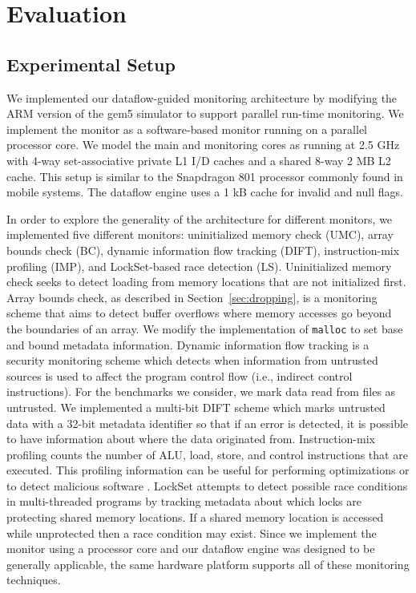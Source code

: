 \section{Evaluation}
\label{sec:evaluation}

\subsection{Experimental Setup}
\label{sec:evaluation.setup}

We implemented our dataflow-guided monitoring architecture by
modifying the ARM version of the gem5 simulator \cite{gem5} to support parallel
run-time monitoring. We implement the monitor as a software-based monitor
running on a parallel processor core. We model the main and monitoring cores as
running at 2.5
GHz with 4-way set-associative private L1 I/D caches and a shared 8-way 2 MB L2
cache. This setup is similar to the Snapdragon 801 processor commonly found in
mobile systems. The dataflow engine uses a 1 kB cache for invalid and null flags.

In order to explore the generality of the architecture for
different monitors, we implemented five different monitors: uninitialized
memory check (UMC), array bounds check (BC), dynamic information flow
tracking (DIFT), instruction-mix profiling (IMP), and LockSet-based race detection (LS).  Uninitialized memory
check seeks to detect loading from
memory locations that are not initialized first. Array bounds check, as
described in Section~\ref{sec:dropping}, is a monitoring scheme that aims to
detect buffer overflows where memory accesses go beyond the boundaries of an
array. We modify the implementation of {\tt malloc} to set base and bound
metadata information. Dynamic information flow tracking is a security
monitoring scheme
which detects when information from untrusted sources is used to affect the
program control flow (i.e., indirect control instructions). For the benchmarks we consider, we mark data read from
files as untrusted. We implemented a multi-bit DIFT scheme which marks
untrusted data with a 32-bit metadata identifier so
that if an error is detected, it is possible to have information about where
the data originated from. Instruction-mix profiling counts the number of ALU,
load, store, and control instructions that are executed. This profiling
information can be useful for performing optimizations or to detect malicious
software \cite{tang-raid14}.
LockSet attempts to detect possible race conditions in multi-threaded programs
by tracking metadata about which locks are protecting shared memory
locations. If a shared memory location is accessed while unprotected
then a race condition may exist. Since we implement the monitor using a
processor core and our dataflow engine was designed to be generally applicable,
the same hardware platform supports all of these monitoring techniques.


